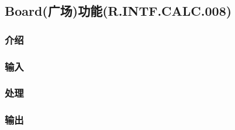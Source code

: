 \subsection{Board(广场)功能(R.INTF.CALC.008)}
\subsubsection{介绍}
\subsubsection{输入}
\subsubsection{处理}
\subsubsection{输出}